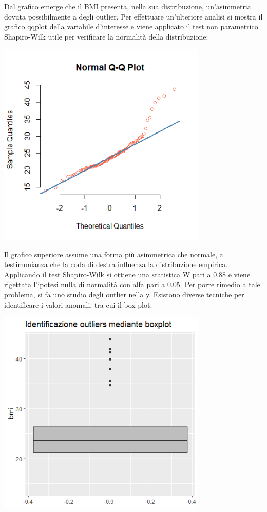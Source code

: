 Dal grafico emerge che il BMI presenta, nella sua distribuzione, un’asimmetria dovuta possibilmente a degli outlier. Per effettuare un'ulteriore analisi si mostra il grafico qqplot della variabile d'interesse e viene applicato il test non parametrico Shapiro-Wilk utile per verificare la normalità della distribuzione: 
\begin{Figure}
    \centering
    \includegraphics[width=10cm,keepaspectratio]{images/qqplot_bmi_con_outliers.png}
  \end{Figure}
Il grafico superiore assume una forma più asimmetrica che normale, a testimonianza che la coda di destra influenza la distribuzione empirica. Applicando il test Shapiro-Wilk si ottiene una statistica W pari a 0.88 e viene rigettata l’ipotesi nulla di normalità con alfa pari a 0.05. Per porre rimedio a tale problema, si fa uno studio degli outlier nella y. Esistono diverse tecniche per identificare i valori anomali, tra cui il box plot:

\begin{Figure}
    \centering
    \includegraphics[width=10cm,keepaspectratio]{images/box_plot_outliers.png}
  \end{Figure}

